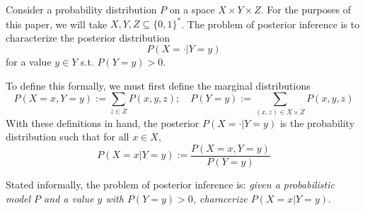 \documentclass{article}
\theoremstyle{definition}
\theoremstyle{remark}
\begin{document}
Consider a probability distribution $P$ on a space $X \times Y \times Z$.
For the purposes of this paper, we will take $X, Y, Z \subseteq \{0, 1\}^*$.
The problem of posterior inference is to characterize the posterior distribution
$$
P(X = \cdot | Y = y)
$$
for a value $y \in Y$ s.t. $P(Y = y) > 0$.

To define this formally, we must first define the marginal distributions
$$
P(X = x, Y = y) := \sum_{z \in Z} P(x, y, z); \quad P(Y = y) := \sum_{(x, z) \in X \times Z} P(x, y, z)
$$
With these definitions in hand, the posterior $P(X = \cdot | Y = y)$ is the probability distribution such that for all $x \in X$,
$$
P(X = x | Y = y) := \frac{P(X = x, Y = y)}{P(Y = y)}
$$

Stated informally, the problem of posterior inference is:
\textit{given a probabilistic model $P$ and a value $y$ with $P(Y = y) > 0$, characerize $P(X = x | Y = y)$}.
\end{document}

